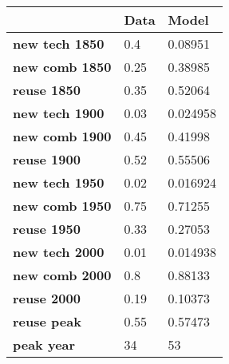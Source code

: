 \begin{tabular}{|l|l|l|}
\hline
&\textbf{Data}&\textbf{Model}\\\hline
\textbf{new tech 1850}&0.4&0.08951\\\hline
\textbf{new comb 1850}&0.25&0.38985\\\hline
\textbf{reuse 1850}&0.35&0.52064\\\hline
\textbf{new tech 1900}&0.03&0.024958\\\hline
\textbf{new comb 1900}&0.45&0.41998\\\hline
\textbf{reuse 1900}&0.52&0.55506\\\hline
\textbf{new tech 1950}&0.02&0.016924\\\hline
\textbf{new comb 1950}&0.75&0.71255\\\hline
\textbf{reuse 1950}&0.33&0.27053\\\hline
\textbf{new tech 2000}&0.01&0.014938\\\hline
\textbf{new comb 2000}&0.8&0.88133\\\hline
\textbf{reuse 2000}&0.19&0.10373\\\hline
\textbf{reuse peak}&0.55&0.57473\\\hline
\textbf{peak year}&34&53\\\hline
\end{tabular}
